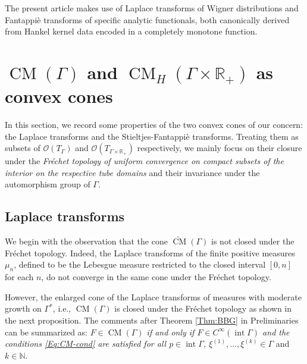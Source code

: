 \documentclass[11pt,reqno]{amsart}
\theoremstyle{plain}
\theoremstyle{definition}
\numberwithin{equation}{section}
\begin{document}
The present article makes use of Laplace transforms of Wigner distributions and Fantappi\`e transforms of specific analytic functionals, both canonically derived from Hankel kernel data encoded in a completely monotone function.

      
	
	\section{$\operatorname{CM}(\Gamma)$ and $\operatorname{CM}_{H}(\Gamma \times \mathbb{R}_+)$ as convex cones} \label{sec:convexity}
	In this section, we record some properties of the two convex cones of our concern: the Laplace transforms and the Stieltjes-Fantappi\`e transforms. Treating them as subsets of $\mathcal{O}(T_\Gamma)$ and $\mathcal{O}(T_{\Gamma \times \mathbb{R}_+})$ respectively, we mainly focus on their closure under the {\em Fr\'echet topology of uniform convergence on compact subsets of the interior on the respective tube domains}
    and their invariance under the automorphism group of $\Gamma$.
    
	\subsection{Laplace transforms}
	We begin with the observation that the cone $\widetilde {\operatorname{CM}}(\Gamma)$ is not closed under the Fr\'echet topology. Indeed, the Laplace transforms of the finite positive measures $\mu_n$, defined to be the Lebesgue measure restricted to the closed interval $[0, n]$ for each $n$, do not converge in the same cone under the Fr\'echet topology.
    
However, the enlarged cone of the Laplace transforms of measures with moderate growth on $\Gamma^*$, i.e., ${\operatorname{CM}(\Gamma)}$ is closed under the Fr\'echet topology as shown in the next proposition. The comments after Theorem \ref{Thm:BBG} in Preliminaries can be summarized as: {\em $F \in {\operatorname{CM}(\Gamma)}$ if and only if $F \in C^\infty(\operatorname{int} \Gamma)$ and the conditions \eqref{Eq:CM-cond} are satisfied for all $p \in \operatorname{int} \Gamma$, $\xi^{(1)}, \dots, \xi^{(k)} \in \Gamma$} and $k\in \mathbb{N}$.
    
\end{document}

